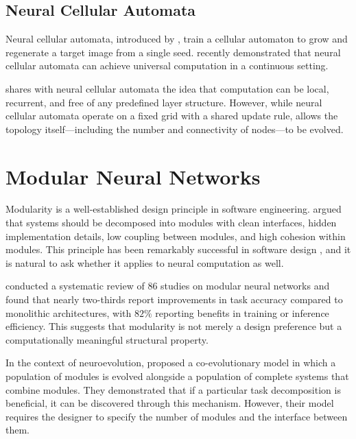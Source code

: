 \subsection{Neural Cellular Automata}

Neural cellular automata, introduced by \citet{mordvintsev2020growing},
train a cellular automaton to grow and regenerate a target image from a
single seed. \citet{bena2025path} recently demonstrated that neural
cellular automata can achieve universal computation in a continuous
setting.

\modnet{} shares with neural cellular automata the idea that computation
can be local, recurrent, and free of any predefined layer structure.
However, while neural cellular automata operate on a fixed grid with a
shared update rule, \modnet{} allows the topology itself---including the
number and connectivity of nodes---to be evolved.

\section{Modular Neural Networks}
\label{sec:related-modular}

Modularity is a well-established design principle in software
engineering. \citet{parnas1972modularity} argued that systems should be
decomposed into modules with clean interfaces, hidden implementation
details, low coupling between modules, and high cohesion within modules.
This principle has been remarkably successful in software design
\citep{larman2004applying}, and it is natural to ask whether it applies
to neural computation as well.

\citet{alho2024modularity} conducted a systematic review of $86$ studies
on modular neural networks and found that nearly two-thirds report
improvements in task accuracy compared to monolithic architectures, with
$82\%$ reporting benefits in training or inference efficiency. This
suggests that modularity is not merely a design preference but a
computationally meaningful structural property.

In the context of neuroevolution, \citet{khare2005coevolutionary}
proposed a co-evolutionary model in which a population of modules is
evolved alongside a population of complete systems that combine modules.
They demonstrated that if a particular task decomposition is beneficial,
it can be discovered through this mechanism. However, their model
requires the designer to specify the number of modules and the interface
between them.

